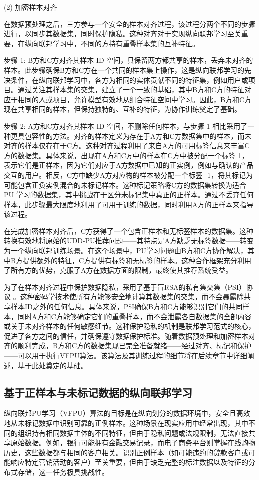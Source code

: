 (2) 加密样本对齐
	
在数据预处理之后，三方参与一个安全的样本对齐过程，该过程分两个不同的步骤进行，以同步其数据集，同时保护隐私。这种对齐对于实现纵向联邦学习至关重要，在纵向联邦学习中，不同的方持有重叠样本集的互补特征。 
	
步骤 1: B方和C方对齐其样本 ID 空间，只保留两方都共享的样本，丢弃未对齐的样本。此步骤确保B方和C方在一个共同的样本集上操作，这是纵向联邦学习的先决条件，在纵向联邦学习中，各方为相同的实体贡献不同的特征集，例如用户或项目。通过关注其样本集的交集，建立了一个一致的基础，其中B方和C方的特征对应于相同的人或项目，允许模型有效地从组合特征空间中学习。因此，B方和C方现在共享相同的样本，但保持独特的、互补的特征，为协作训练奠定了基础。

步骤 2: A方和C方对齐其样本 ID 空间，不删除任何样本，与步骤 1 相比采用了一种更具包容性的方法。对齐的样本定义为存在于A方和C方数据集中的样本，而未对齐的样本仅存在于C方。这种对齐过程利用了来自A方的可用标签信息来丰富C方的数据集。具体来说，出现在A方和C方中的样本在C方中被分配一个标签 1，表示它们是正样本，因为它们对应于A方数据中已知的正实例，例如与确认的产品交互的用户。相反，C方中缺少A方对应物的样本被分配一个标签 -1，将其标记为可能包含正负实例混合的未标记样本。这种标记策略将C方的数据集转换为适合 PU 学习的数据集，其中挑战在于区分未标记集中真正的正样本。通过不丢弃任何样本，此步骤最大限度地利用了可用于训练的数据，同时利用A方的正样本来指导该过程。

在完成加密样本对齐后，C方获得了一个包含正样本和无标签样本的数据集。这种转换有效地将原始的UDD-PU推荐问题——其特点是A方缺乏无标签数据——转变为一个纵向联邦训练场景。在这个场景中，PU学习问题由B方和C方协作解决，其中B方提供额外的特征，C方提供有标签和无标签的样本。这种合作框架充分利用了所有方的优势，克服了A方在数据方面的限制，最终使其推荐系统受益。

为了在样本对齐过程中保护数据隐私，采用了基于盲RSA的私有集交集（PSI）协议 \textsuperscript{\cite{de2010practical}}。这种密码学技术使所有方能够安全地计算其数据集的交集，而不会暴露除共享样本ID之外的任何信息。具体来说，PSI确保B方和C方能够识别它们的共同样本，同时A方和C方能够确定它们的重叠样本，而不会泄露各自数据集的全部内容或关于未对齐样本的任何敏感细节。这种保护隐私的机制是联邦学习范式的核心，促进了各方之间的信任，并确保遵守数据保护标准。随着数据预处理和加密样本对齐的顺利完成，B方和C方的数据集现已完全准备就绪——经过对齐、标记和保护——可以用于执行VFPU算法。该算法及其训练过程的细节将在后续章节中详细阐述，基于此处奠定的基础。


\subsection{基于正样本与未标记数据的纵向联邦学习}
纵向联邦PU学习（VFPU）算法的目标是在纵向划分的数据环境中，安全且高效地从未标记数据中识别可靠的正例样本。这种场景在现实应用中经常出现，其中不同的组织持有相同数据主体的不同特征，但由于隐私问题或法规限制，无法直接共享原始数据。例如，银行可能拥有金融交易记录，而电子商务平台则掌握在线购物历史，这些数据都与相同的客户相关。识别正例样本（如可能违约的贷款客户或可能响应特定营销活动的客户）至关重要，但由于缺乏完整的标注数据以及特征的分布式存储，这一任务极具挑战性。

